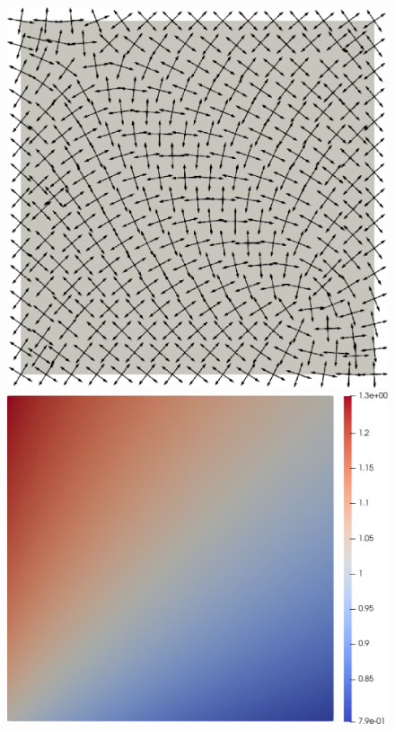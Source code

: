 \begin{figure}[!h]
  \centering
  \includegraphics[scale=0.18]{images/cross_from_repre_field.pdf}\hspace{0.5cm}
  \includegraphics[scale=0.188]{images/scal_field.pdf}\hspace{0.5cm}

\end{figure}

